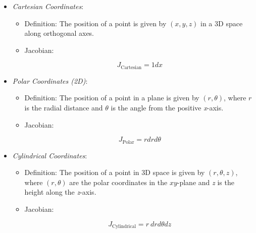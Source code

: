 \begin{itemize}

    \item \emph{Cartesian Coordinates}:

    \begin{itemize}
        
        \item Definition: The position of a point is given by \((x, y, z)\) in a 3D space along 
              orthogonal axes.
        
        \item Jacobian: 
        
            \[
                J_{\text{Cartesian}} = 1dx
            \]
    
    \end{itemize}

    \item \emph{Polar Coordinates (2D)}:

    \begin{itemize}

        \item Definition: The position of a point in a plane is given by \((r, \theta)\), where \(r\) 
              is the radial distance and \(\theta\) is the angle from the positive \emph{x}-axis.
        
              \item Jacobian:
        
        \[
            J_{\text{Polar}} = rd rd\theta
        \]

    \end{itemize}

    \item \emph{Cylindrical Coordinates}:

    \begin{itemize}
        
        \item Definition: The position of a point in 3D space is given by \((r, \theta, z)\), where 
              \((r, \theta)\) are the polar coordinates in the \(xy\)-plane and \emph{z} is the height along 
              the \emph{z}-axis.
        
        \item Jacobian:
        
            \[
                J_{\text{Cylindrical}} = r\ dr d\theta dz
            \]

    \end{itemize}


\end{itemize}
